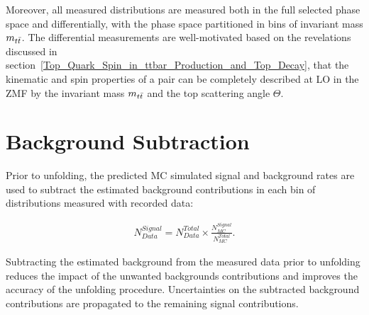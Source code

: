 Moreover, all measured distributions are measured both in the full selected phase space and differentially, with the phase space partitioned in bins of \ttbar invariant mass $m_{t\bar{t}}$.
The differential measurements are well-motivated based on the revelations discussed in section~\ref{Top_Quark_Spin_in_ttbar_Production_and_Top_Decay}, that the kinematic and spin properties of a \ttbar pair can be completely described at LO in the \ttbar ZMF by the invariant mass $m_{t\bar{t}}$ and the top scattering angle $\Theta$.

\section{Background Subtraction}
\label{Background_Subtraction}
Prior to unfolding, the predicted MC simulated signal and background rates are used to subtract the estimated background contributions in each bin of distributions measured with recorded data:
\begin{linenomath*}
\begin{align}
N^{Signal}_{Data} = N^{Total}_{Data} \times \frac{N^{Signal}_{MC}}{N^{Total}_{MC}}.
\label{Data_Background_Subtraction}
\end{align}
\end{linenomath*}
Subtracting the estimated background from the measured data prior to unfolding reduces the impact of the unwanted backgrounds contributions and improves the accuracy of the unfolding procedure.
Uncertainties on the subtracted background contributions are propagated to the remaining signal contributions.

